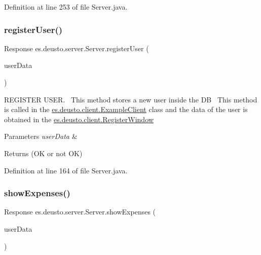 Definition at line 253 of file Server.\+java.

\mbox{\label{classes_1_1deusto_1_1server_1_1_server_a12f56d7a970c3c41fefe8ed2db835c0a}} 
\subsubsection{\texorpdfstring{register\+User()}{registerUser()}}
{\footnotesize\ttfamily Response es.\+deusto.\+server.\+Server.\+register\+User (\begin{DoxyParamCaption}\item[{\hyperlink{classes_1_1deusto_1_1serialization_1_1_user_data}{User\+Data}}]{user\+Data }\end{DoxyParamCaption})}

R\+E\+G\+I\+S\+T\+ER U\+S\+ER.~\newline
This method stores a new user inside the DB~\newline
This method is called in the \hyperlink{classes_1_1deusto_1_1client_1_1_example_client}{es.\+deusto.\+client.\+Example\+Client} class and the data of the user is obtained in the \hyperlink{classes_1_1deusto_1_1client_1_1_register_window}{es.\+deusto.\+client.\+Register\+Window}~\newline

\begin{DoxyParams}{Parameters}
{\em user\+Data} & \\
\hline
\end{DoxyParams}
\begin{DoxyReturn}{Returns}
(OK or not OK) 
\end{DoxyReturn}


Definition at line 164 of file Server.\+java.

\mbox{\label{classes_1_1deusto_1_1server_1_1_server_aa28b04cc2643cf60072fc2a680288cde}} 
\subsubsection{\texorpdfstring{show\+Expenses()}{showExpenses()}}
{\footnotesize\ttfamily Response es.\+deusto.\+server.\+Server.\+show\+Expenses (\begin{DoxyParamCaption}\item[{\hyperlink{classes_1_1deusto_1_1serialization_1_1_user_data}{User\+Data}}]{user\+Data }\end{DoxyParamCaption})}

